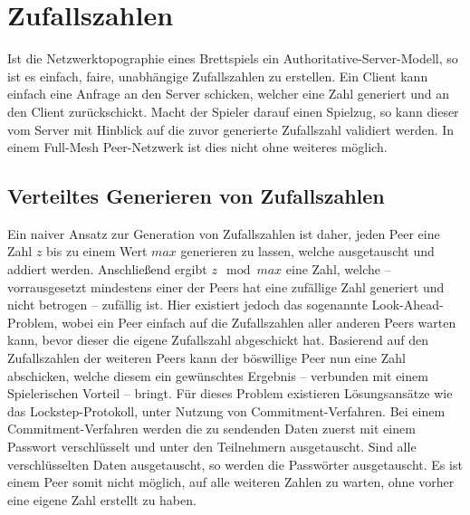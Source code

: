 \section{Zufallszahlen}
Ist die Netzwerktopographie eines Brettspiels ein Authoritative-Server-Modell, so ist es einfach, faire, unabhängige Zufallszahlen zu erstellen. Ein Client kann einfach eine Anfrage an den Server schicken, welcher eine Zahl generiert und an den Client zurückschickt. Macht der Spieler darauf einen Spielzug, so kann dieser vom Server mit Hinblick auf die zuvor generierte Zufallszahl validiert werden. In einem Full-Mesh Peer-Netzwerk ist dies nicht ohne weiteres möglich.\par

\subsection{Verteiltes Generieren von Zufallszahlen}
Ein naiver Ansatz zur Generation von Zufallszahlen ist daher, jeden Peer eine Zahl $z$ bis zu einem Wert $max$ generieren zu lassen, welche ausgetauscht und addiert werden. Anschließend ergibt $z \mod max$ eine Zahl, welche -- vorrausgesetzt mindestens einer der Peers hat eine zufällige Zahl generiert und nicht betrogen -- zufällig ist. Hier existiert jedoch das sogenannte \glqq{}Look-Ahead-Problem\grqq{}, wobei ein Peer einfach auf die Zufallszahlen aller anderen Peers warten kann, bevor dieser die eigene Zufallszahl abgeschickt hat. Basierend auf den Zufallszahlen der weiteren Peers kann der böswillige Peer nun eine Zahl abschicken, welche diesem ein gewünschtes Ergebnis -- verbunden mit einem Spielerischen Vorteil -- bringt. Für dieses Problem existieren Lösungsansätze wie das \glqq{}Lockstep-Protokoll\grqq{}, unter Nutzung von Commitment-Verfahren. Bei einem Commitment-Verfahren werden die zu sendenden Daten zuerst mit einem Passwort verschlüsselt und unter den Teilnehmern ausgetauscht. Sind alle verschlüsselten Daten ausgetauscht, so werden die Passwörter ausgetauscht. Es ist einem Peer somit nicht möglich, auf alle weiteren Zahlen zu warten, ohne vorher eine eigene Zahl erstellt zu haben.\par

